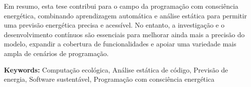 Em resumo, esta tese contribui para o campo da programação com consciência energética, combinando aprendizagem automática e análise estática para permitir uma previsão energética precisa e acessível. No entanto, a investigação e o desenvolvimento contínuos são essenciais para melhorar ainda mais a precisão do modelo, expandir a cobertura de funcionalidades e apoiar uma variedade mais ampla de cenários de programação.


\vfill

\begin{flushleft}
\textbf{Keywords:}
Computação ecológica, Análise estática de código, Previsão de energia, Software sustentável, Programação com consciência energética
\end{flushleft}

